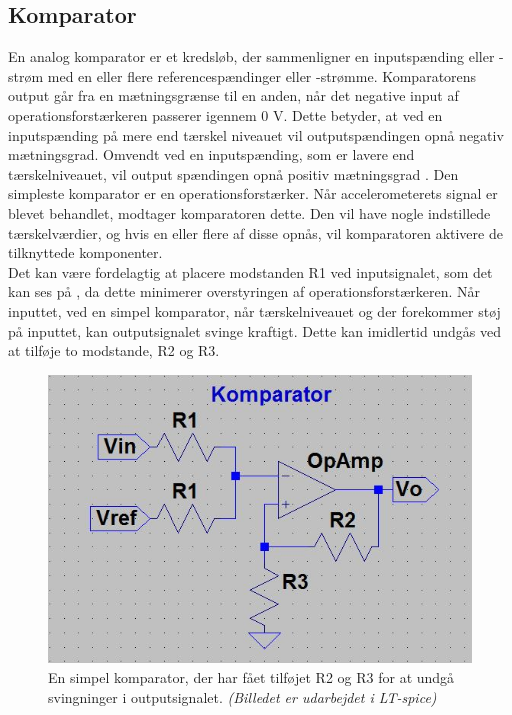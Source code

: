 \subsection{Komparator}\label{Komparatorafsnit}
En analog komparator er et kredsløb, der sammenligner en inputspænding eller -strøm med en eller flere referencespændinger eller -strømme. Komparatorens output går fra en mætningsgrænse til en anden, når det negative input af operationsforstærkeren passerer igennem 0 V. Dette betyder, at ved en inputspænding på mere end tærskel niveauet vil outputspændingen opnå negativ mætningsgrad. Omvendt ved en inputspænding, som er lavere end tærskelniveauet, vil output spændingen opnå positiv mætningsgrad .  Den simpleste komparator er en operationsforstærker. \cite{webster2009} Når accelerometerets signal er blevet behandlet, modtager komparatoren dette. Den vil have nogle indstillede tærskelværdier, og hvis en eller flere af disse opnås, vil komparatoren aktivere de tilknyttede komponenter. \\
Det kan være fordelagtig at placere modstanden R1 ved inputsignalet, som det kan ses på , da dette minimerer overstyringen af operationsforstærkeren.  Når inputtet, ved en simpel komparator, når tærskelniveauet og der forekommer støj på inputtet, kan outputsignalet svinge kraftigt. Dette kan imidlertid undgås ved at tilføje to modstande, R2 og R3. \cite{webster2009}
\begin{figure}[H]
\centering
\includegraphics[scale=0.6]{figures/cProblemloesning/Komparator.JPG}
\caption{En simpel komparator, der har fået tilføjet R2 og R3 for at undgå svingninger i outputsignalet. \textit{(Billedet er udarbejdet i LT-spice)}}
\label{komparator}
\end{figure}
